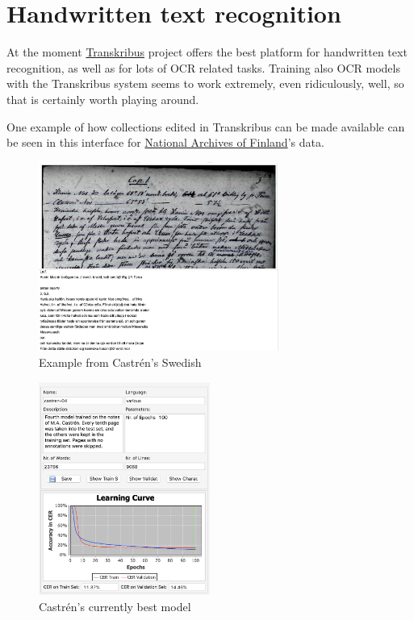 \documentclass[]{book}
\begin{document}
\hypertarget{htr}{%
\chapter{Handwritten text recognition}\label{htr}}

At the moment \href{https://transkribus.eu}{Transkribus} project offers the best platform for handwritten text recognition, as well as for lots of OCR related tasks. Training also OCR models with the Transkribus system seems to work extremely, even ridiculously, well, so that is certainly worth playing around.

One example of how collections edited in Transkribus can be made available can be seen in this interface for \href{https://transkribus.eu/r/kansallisarkisto/}{National Archives of Finland}'s data.

\begin{figure}
\centering
\includegraphics[width=0.7\textwidth,height=\textheight]{images/transkribus_castren.jpg}
\caption{Example from Castrén's Swedish}
\end{figure}

\begin{figure}
\centering
\includegraphics[width=0.5\textwidth,height=\textheight]{images/transkribus_castren_model.jpg}
\caption{Castrén's currently best model}
\end{figure}
\end{document}
